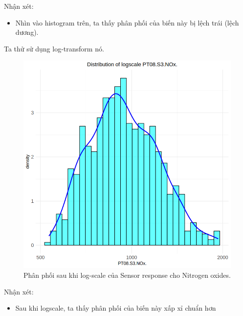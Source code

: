 Nhận xét:
\begin{itemize}
    \item Nhìn vào histogram trên, ta thấy phân phối của biến này bị lệch trái (lệch dương).
\end{itemize}

Ta thử sử dụng log-transform nó.

\begin{figure}[H]
    \centering
    \includegraphics[width=0.75\columnwidth]{air_figures/PT08.S3(NOx)_logscale_distribution.png}
    \caption{Phân phối sau khi log-scale của Sensor response cho Nitrogen oxides.}
    \label{fig:ptnox_logscale_distribution}
\end{figure}
Nhận xét:
\begin{itemize}
    \item Sau khi logscale, ta thấy phân phối của biến này xấp xỉ chuẩn hơn
\end{itemize}

